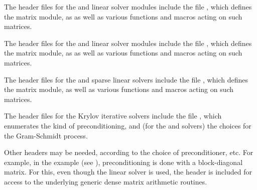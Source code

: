 The header files for the {\sunlinsoldense} and {\sunlinsollapdense}
linear solver modules include the file
, which defines the {\sunmatdense}
matrix module, as as well as various functions and macros acting on
such matrices.

The header files for the {\sunlinsolband} and {\sunlinsollapband}
linear solver modules include the file
, which defines the {\sunmatband}
matrix module, as as well as various functions and macros acting on
such matrices.

The header files for the {\sunlinsolklu} and {\sunlinsolslumt}
sparse linear solvers include the file
, which defines the {\sunmatsparse}
matrix module, as well as various functions and macros acting on such
matrices.

The header files for the Krylov iterative solvers include the file
, which enumerates the kind of
preconditioning, and (for the {\spgmr} and {\spfgmr} solvers) the
choices for the Gram-Schmidt process.

Other headers may be needed, according to the choice of
preconditioner, etc.  For example, in the 
example (see \cite{ida_ex}), preconditioning is done with a
block-diagonal matrix. For this, even though the {\sunlinsolspgmr}
linear solver is used, the header  is
included for access to the underlying generic dense matrix arithmetic
routines.

